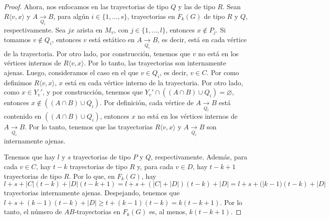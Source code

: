 \begin{proof}
    Ahora, nos enfocamos en las trayectorias de tipo $Q$ y las de tipo $R$. Sean
    $R\langle v,x \rangle$ y $A \xrightarrow[Q_i]{}  B$, para alg\'un $i \in
    \{1, \dots, s\}$, trayectorias en $F_k(G)$ de tipo $R$ y $Q$,
    respectivamente. Sea $jx$ arista en $M_v$, con $j \in \{1, \dots, l\}$,
    entonces $x \notin P_j$. Si tomamos $v \notin Q_i$, entonces $v$ est\'a
    est\'atico en $A \xrightarrow[Q_i]{} B$, es decir, est\'a en cada v\'ertice
    de la trayectoria. Por otro lado, por construcci\'on, tenemos que $v$ no
    est\'a en los v\'ertices internos de $R \langle v, x \rangle$. Por lo tanto,
    las trayectorias son internamente ajenas. Luego, consideramos el caso en el
    que $v \in Q_i$, es decir, $v \in C$. Por como definimos $R \langle v,x
    \rangle$, $x$ est\'a en cada v\'ertice interno de la trayectoria. Por otro
    lado, como $x \in Y_v'$, y por construcci\'on, tenemos que $Y_v ' \cap
    ((A\cap B) \cup Q_i) = \varnothing$, entonces $x \notin ((A \cap B) \cup
    Q_i)$. Por definici\'on, cada v\'ertice de $A \xrightarrow[Q_i]{}  B$ est\'a
    contenido en $((A \cap B) \cup Q_i)$, entonces $x$ no est\'a en los
    v\'ertices internos de $A \xrightarrow[Q_i]{} B$. Por lo tanto, tenemos que
    las trayectorias $R \langle v,x \rangle$ y $A \xrightarrow[Q_i]{}  B$ son
    internamente ajenas.

    Tenemos que hay $l$ y $s$ trayectorias de tipo $P$ y $Q$, respectivamente.
    Adem\'as, para cada $v \in C$, hay $t-k$ trayectorias de tipo $R$ y, para
    cada $v \in D$, hay $t-k+1$ trayectorias de tipo $R$. Por lo que, en
    $F_k(G)$, hay $l+ s+ |C|(t-k)+ |D|(t-k +1) = l + s + (|C| + |D|)(t-k) + |D|
    = l + s + (|k-1)(t-k) + |D|$ trayectorias internamente ajenas. Despejando,
    tenemos que $l + s + (k-1)(t-k) + |D| \geq t+ (k-1)(t-k) = k (t -k +1)$. Por
    lo tanto, el n\'umero de $AB$-trayectorias en $F_k(G)$ es, al menos,
    $k(t-k+1)$.

\end{proof}

